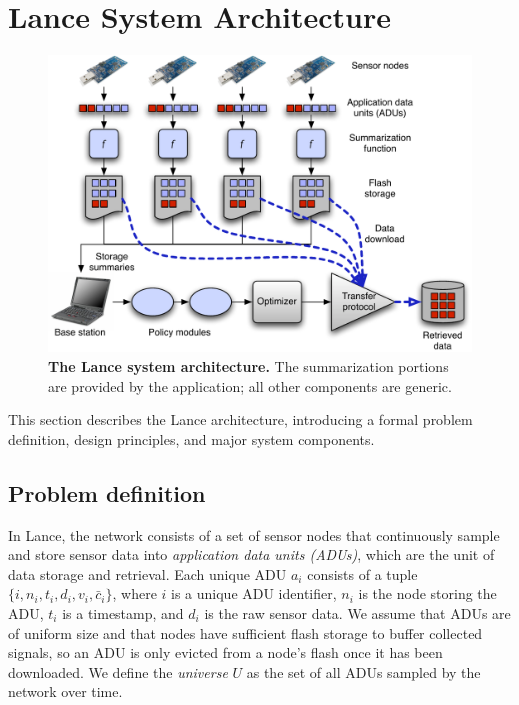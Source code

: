 \section{Lance System Architecture}
\label{lance-sec-architecture}

\begin{figure}[t]
\label{lance-fig-architecture}
\begin{center}
\includegraphics[width=1.0\hsize]{./4-lance/figs/new-arch.pdf}
\end{center}
\caption{\textbf{The Lance system architecture.}
The summarization portions are provided by the application; all other
components are generic.}
\end{figure}

This section describes the Lance architecture, introducing a formal problem
definition, design principles, and major system components.

\subsection{Problem definition}
\label{lance-sec-problem-definition}

In Lance, the network consists of a set of sensor nodes that continuously
sample and store sensor data into {\em application data units (ADUs)}, which
are the unit of data storage and retrieval.  Each unique ADU $a_i$ consists
of a tuple $\{ i, n_i, t_i, d_i, v_i, \bar{c}_i \}$, 
where $i$ is a unique ADU identifier,
$n_i$ is the node storing the ADU, $t_i$ is a timestamp, and $d_i$ is the raw
sensor data.  We assume that ADUs are of uniform size and that nodes 
have sufficient flash storage to buffer collected signals, so an 
ADU is only evicted from a node's flash once it has been downloaded.
We define the {\em universe} $U$ as the set of all ADUs sampled by the 
network over time. 

